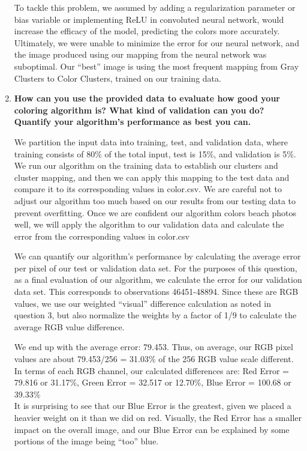 \documentclass[a4paper]{article}
\begin{document}
\begin{enumerate}
To tackle this problem, we assumed by adding a regularization parameter or bias variable or implementing ReLU in convoluted neural network, would increase the efficacy of the model, predicting the colors more accurately. Ultimately, we were unable to minimize the error for our neural network, and the image produced using our mapping from the neural network was suboptimal. Our ``best'' image is using the most frequent mapping from Gray Clusters to Color Clusters, trained on our training data.


\bigskip
\item \textbf{How can you use the provided data to evaluate how good your coloring algorithm is? What kind of validation can you do? Quantify your algorithm's performance as best you can.}

We partition the input data into training, test, and validation data, where training consists of 80\% of the total input, test is 15\%, and validation is 5\%. We run our algorithm on the training data to establish our clusters and cluster mapping, and then we can apply this mapping to the test data and compare it to its corresponding values in color.csv. We are careful not to adjust our algorithm too much based on our results from our testing data to prevent overfitting. Once we are confident our algorithm colors beach photos well, we will apply the algorithm to our validation data and calculate the error from the corresponding values in color.csv

We can quantify our algorithm's performance by calculating the average error per pixel of our test or validation data set. For the purposes of this question, as a final evaluation of our algorithm, we calculate the error for our validation data set. This corresponds to observations 46451-48894. Since these are RGB values, we use our weighted ``visual'' difference calculation as noted in question 3, but also normalize the weights by a factor of 1/9 to calculate the average RGB value difference. 

We end up with the average error: 79.453. Thus, on average, our RGB pixel values are about 79.453/256 = 31.03\% of the 256 RGB value scale different. In terms of each RGB channel, our calculated differences are: Red Error = 79.816 or 31.17\%, Green Error = 32.517 or 12.70\%, Blue Error = 100.68 or 39.33\%\\
It is surprising to see that our Blue Error is the greatest, given we placed a heavier weight on it than we did on red. Visually, the Red Error has a smaller impact on the overall image, and our Blue Error can be explained by some portions of the image being ``too'' blue.


\end{enumerate}
\end{document}
